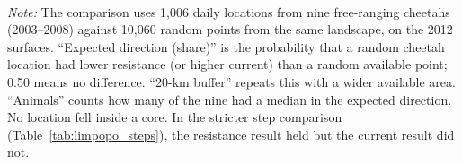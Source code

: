\\[0.5em]
\noindent\parbox{\textwidth}{\footnotesize\emph{Note:} The comparison uses 1,006 daily locations from nine free-ranging cheetahs (2003--2008) against 10,060 random points from the same landscape, on the 2012 surfaces. ``Expected direction (share)'' is the probability that a random cheetah location had lower resistance (or higher current) than a random available point; 0.50 means no difference. ``20-km buffer'' repeats this with a wider available area. ``Animals'' counts how many of the nine had a median in the expected direction. No location fell inside a core. In the stricter step comparison (Table~\ref{tab:limpopo_steps}), the resistance result held but the current result did not.}

